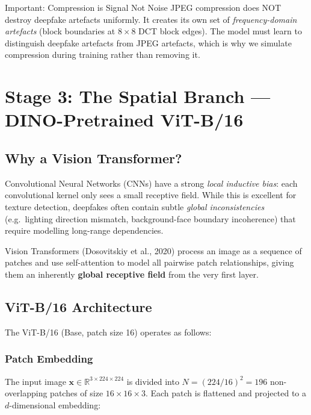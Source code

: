 \documentclass[12pt,a4paper]{article}
\begin{document}
\begin{warningbox}{Important: Compression is Signal Not Noise}
JPEG compression does NOT destroy deepfake artefacts uniformly. It creates its own set
of \textit{frequency-domain artefacts} (block boundaries at $8\times8$ DCT block edges).
The model must learn to distinguish deepfake artefacts from JPEG artefacts, which is why
we simulate compression during training rather than removing it.
\end{warningbox}

\newpage

\section{Stage 3: The Spatial Branch --- DINO-Pretrained ViT-B/16}

\subsection{Why a Vision Transformer?}

Convolutional Neural Networks (CNNs) have a strong \textit{local inductive bias}: each
convolutional kernel only sees a small receptive field. While this is excellent for
texture detection, deepfakes often contain subtle \textit{global inconsistencies} (e.g.\
lighting direction mismatch, background-face boundary incoherence) that require modelling
long-range dependencies.

Vision Transformers (Dosovitskiy et al., 2020) process an image as a sequence of patches
and use self-attention to model all pairwise patch relationships, giving them an inherently
\textbf{global receptive field} from the very first layer.

\subsection{ViT-B/16 Architecture}

The ViT-B/16 (Base, patch size 16) operates as follows:

\subsubsection{Patch Embedding}

The input image $\mathbf{x} \in \mathbb{R}^{3 \times 224 \times 224}$ is divided into
$N = (224/16)^2 = 196$ non-overlapping patches of size $16 \times 16 \times 3$. Each
patch is flattened and projected to a $d$-dimensional embedding:
\end{document}
